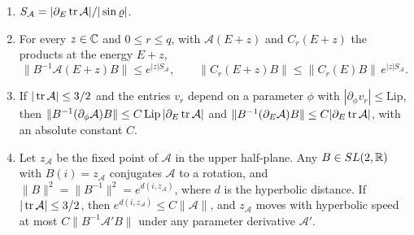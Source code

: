 \begin{lemma}\label{lem:blocks}
\begin{enumerate}
\item $S_{\mathcal A}=|\partial_E\operatorname{tr}\mathcal A|/|\sin\varrho|$.
\item For every $z\in\mathbb C$ and $0\le r\le q$, with $\mathcal A(E+z)$ and $C_r(E+z)$ the products at the energy $E+z$,
\[
\|B^{-1}\mathcal A(E+z)B\|\le e^{|z|S_{\mathcal A}},\qquad\|C_r(E+z)B\|\le\|C_r(E)B\|\,e^{|z|S_{\mathcal A}}.
\]
\item If $|\operatorname{tr}\mathcal A|\le3/2$ and the entries $v_r$ depend on a parameter $\phi$ with $|\partial_\phi v_r|\le\mathrm{Lip}$, then $\|B^{-1}(\partial_\phi\mathcal A)B\|\le C\,\mathrm{Lip}\,|\partial_E\operatorname{tr}\mathcal A|$ and $\|B^{-1}(\partial_E\mathcal A)B\|\le C|\partial_E\operatorname{tr}\mathcal A|$, with an absolute constant $C$.
\item Let $z_{\mathcal A}$ be the fixed point of $\mathcal A$ in the upper half-plane. Any $B\in SL(2,\mathbb R)$ with $B(i)=z_{\mathcal A}$ conjugates $\mathcal A$ to a rotation, and $\|B\|^2=\|B^{-1}\|^2=e^{d(i,z_{\mathcal A})}$, where $d$ is the hyperbolic distance. If $|\operatorname{tr}\mathcal A|\le3/2$, then $e^{d(i,z_{\mathcal A})}\le C\|\mathcal A\|$, and $z_{\mathcal A}$ moves with hyperbolic speed at most $C\|B^{-1}\mathcal A'B\|$ under any parameter derivative $\mathcal A'$.
\end{enumerate}
\end{lemma}

